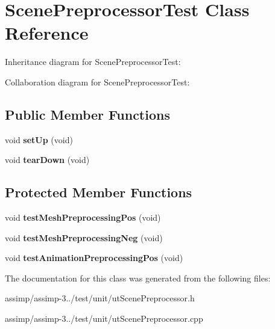 \hypertarget{class_scene_preprocessor_test}{\section{Scene\+Preprocessor\+Test Class Reference}
\label{class_scene_preprocessor_test}
}


Inheritance diagram for Scene\+Preprocessor\+Test\+:


Collaboration diagram for Scene\+Preprocessor\+Test\+:
\subsection*{Public Member Functions}
\begin{DoxyCompactItemize}
\item 
\hypertarget{class_scene_preprocessor_test_a8258da049ea4bab889dca4dd292dfcaa}{void {\bfseries set\+Up} (void)}\label{class_scene_preprocessor_test_a8258da049ea4bab889dca4dd292dfcaa}

\item 
\hypertarget{class_scene_preprocessor_test_a9098398e1a7aebfe35d3379c8ee63127}{void {\bfseries tear\+Down} (void)}\label{class_scene_preprocessor_test_a9098398e1a7aebfe35d3379c8ee63127}

\end{DoxyCompactItemize}
\subsection*{Protected Member Functions}
\begin{DoxyCompactItemize}
\item 
\hypertarget{class_scene_preprocessor_test_a40838ba7d501475f699c9ffd11c71998}{void {\bfseries test\+Mesh\+Preprocessing\+Pos} (void)}\label{class_scene_preprocessor_test_a40838ba7d501475f699c9ffd11c71998}

\item 
\hypertarget{class_scene_preprocessor_test_ac974b3bd511e6cc13de91cc785fe53fa}{void {\bfseries test\+Mesh\+Preprocessing\+Neg} (void)}\label{class_scene_preprocessor_test_ac974b3bd511e6cc13de91cc785fe53fa}

\item 
\hypertarget{class_scene_preprocessor_test_af634d7ec4c9d447a787618f4d0046ce6}{void {\bfseries test\+Animation\+Preprocessing\+Pos} (void)}\label{class_scene_preprocessor_test_af634d7ec4c9d447a787618f4d0046ce6}

\end{DoxyCompactItemize}


The documentation for this class was generated from the following files\+:\begin{DoxyCompactItemize}
\item 
assimp/assimp-\/3../test/unit/ut\+Scene\+Preprocessor.\+h\item 
assimp/assimp-\/3../test/unit/ut\+Scene\+Preprocessor.\+cpp\end{DoxyCompactItemize}
